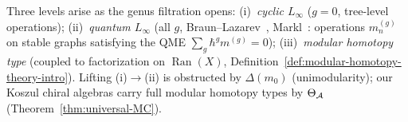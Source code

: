 \begin{remark}
\label{rem:quantum-vs-cyclic-linf}
Three levels arise as the genus filtration opens:
(i)~\emph{cyclic $L_\infty$} ($g = 0$, tree-level operations);
(ii)~\emph{quantum $L_\infty$} (all $g$, Braun--Lazarev~\cite{BL15},
Markl~\cite{Markl06}: operations $m^{(g)}_n$ on stable graphs
satisfying the QME $\sum_g \hbar^g m^{(g)} = 0$);
(iii)~\emph{modular homotopy type} (coupled to factorization on
$\operatorname{Ran}(X)$,
Definition~\ref{def:modular-homotopy-theory-intro}).
Lifting (i)$\to$(ii) is obstructed by $\Delta(m_0)$ (unimodularity);
our Koszul chiral algebras carry full modular homotopy types by
$\Theta_{\mathcal{A}}$ (Theorem~\ref{thm:universal-MC}).
\end{remark}


